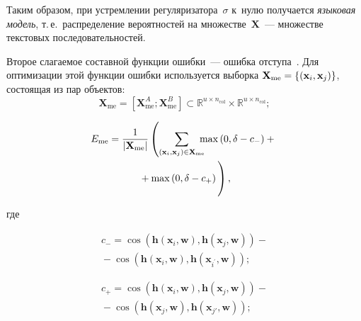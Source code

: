 \begin{multicols}{2}
\smallskip

Таким образом, при устремлении регуляризатора~$\sigma$ к~нулю получается  
\textit{языковая модель}, т.\,е.\ распределение вероятностей на множестве~$\mathbf{X}$~--- 
множестве текстовых последовательностей.

Второе слагаемое составной функции ошибки~--- ошибка отступа~\cite{wieting}. Для 
оптимизации этой функции ошибки используется выборка $\mathbf{X}_{\mathrm{me}}\hm = 
\{ (\mathbf{x}_i, \mathbf{x}_j)\}$, состоящая из пар объектов:
$$
    \mathbf{X}_{\mathrm{me}} = \left[\mathbf{X}_{\mathrm{me}}^A; \mathbf{X}_{\mathrm{me}}^B\right]  
\subset \mathbb{R}^{u \times n_{\mathrm{col}}}  \times  \mathbb{R}^{u \times 
n_{\mathrm{col}}};
$$

\vspace*{-14pt}

\noindent
\begin{multline}
\label{eq:me}
E_{\mathrm{me}} = \fr{1}{|\mathbf{X}_{\mathrm{me}}|}\left( \sum\limits_{(\mathbf{x}_i, 
\mathbf{x}_j) \in \mathbf{X}_{\mathrm{me}}}\!\!\!\!\max \left(0, \delta - c_{-}\right) +{}\right.\\
\left.{}+ \max\left(0, \delta 
- c_{+}\right) 
\vphantom{\sum\limits_{(\mathbf{x}_i, 
\mathbf{x}_j) \in \mathbf{X}_{\mathrm{me}}}}
\right),
\end{multline}

\vspace*{-6pt}


\noindent
где 

\vspace*{-6pt}

\noindent
\begin{multline*}
c_{-} = \cos\left(\mathbf{h}\left(\mathbf{x}_i, \mathbf{w}\right), 
\mathbf{h}\left(\mathbf{x}_j, \mathbf{w}\right)\right) -{}\\
{}- \cos\left(\mathbf{h}\left(\mathbf{x}_i, 
\mathbf{w}\right), \mathbf{h}\left(\mathbf{x}_{i^{'}}, \mathbf{w}\right)\right);
\end{multline*}

\vspace*{-12pt}

\noindent
\begin{multline*}
c_{+} = \cos\left(\mathbf{h}\left(\mathbf{x}_i, \mathbf{w}\right), 
\mathbf{h}\left(\mathbf{x}_j, \mathbf{w}\right)\right) - {}\\
{}-\cos\left(\mathbf{h}\left(\mathbf{x}_j, 
\mathbf{w}\right), \mathbf{h}\left(\mathbf{x}_{j'}, \mathbf{w}\right)\right);
\end{multline*}


\end{multicols}
